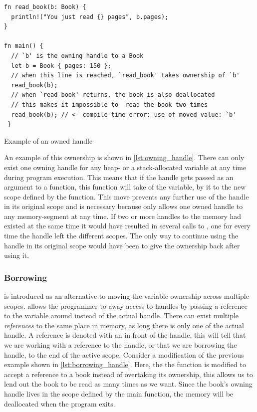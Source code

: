 \begin{listing}[tb]
\begin{verbatim}
fn read_book(b: Book) {
  println!("You just read {} pages", b.pages);
}

fn main() {
  // `b' is the owning handle to a Book
  let b = Book { pages: 150 };
  // when this line is reached, `read_book' takes ownership of `b'
  read_book(b);
  // when `read_book' returns, the book is also deallocated
  // this makes it impossible to  read the book two times
  read_book(b); // <- compile-time error: use of moved value: `b'
 }
\end{verbatim}
\caption{Example of an owned handle}
\label{lst:owning_handle}
\end{listing}

An example of this ownership is shown in \autoref{lst:owning_handle}.
There can only exist one owning handle for any heap- or a stack-allocated variable at any time during program execution.
This means that if the handle gets passed as an argument to a function, this function will take  of the variable, by  it to the new scope defined by the function.
This move prevents any further use of the handle in its original scope and is necessary because {\rust} only allows one owned handle to any memory-segment at any time.
If two or more handles to the memory had existed at the same time it would have resulted in several calls to , one for every time the handle left the different scopes.
The only way to continue using the handle in its original scope would have been to give the ownership back after using it.

\subsubsection{Borrowing}
\label{ssec:borrowing}

 is introduced as an alternative to moving the variable ownership across multiple scopes.
{\rust} allows the programmer to  away access to handles by passing a reference to the variable around instead of the actual handle.
There can exist multiple \emph{references} to the same place in memory, as long there is only one  of the actual handle.
A reference is denoted with an \code{\&} in front of the handle, this will tell {\rust} that we are working with a reference to the handle, or that we are borrowing the handle, to the end of the active scope.
Consider a modification of the previous example shown in \autoref{lst:borrowing_handle}.
Here, the the  function is modified to accept a reference to a book instead of overtaking its ownership, this allows us to lend out the book to be read as many times as we want.
Since the book's owning handle lives in the scope defined by the main function, the memory will be deallocated when the program exits.


